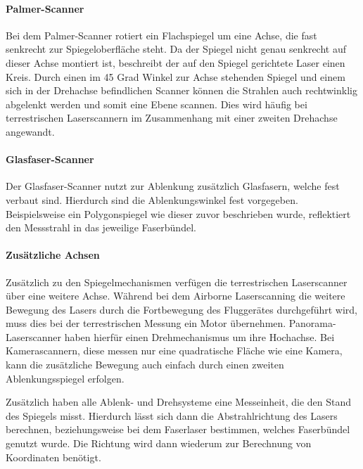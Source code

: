 \documentclass[a4paper,12pt,bibliography=totoc, listof=totoc,titlepage,pointlessnumbers]{scrreprt}
\begin{document}
\paragraph{Palmer-Scanner}
Bei dem Palmer-Scanner rotiert ein Flachspiegel um eine Achse, die fast senkrecht zur Spiegeloberfläche steht. Da der Spiegel nicht genau senkrecht auf dieser Achse montiert ist, beschreibt der auf den Spiegel gerichtete Laser einen Kreis. Durch einen im 45 Grad Winkel zur Achse stehenden Spiegel und einem sich in der Drehachse befindlichen Scanner können die Strahlen auch rechtwinklig abgelenkt werden und somit eine Ebene scannen. Dies wird häufig bei terrestrischen Laser\-scan\-nern im Zusammenhang mit einer zweiten Drehachse angewandt.

\paragraph{Glasfaser-Scanner}
\label{p:faserscanner}
Der Glasfaser-Scanner nutzt zur Ablenkung zu\-sätz\-lich Glasfasern, welche fest verbaut sind. Hierdurch sind die Ablenkungswinkel fest vorgegeben. Beispielsweise ein Polygonspiegel wie dieser zuvor beschrieben wurde, reflektiert den Messstrahl in das jeweilige Faserbündel. 

\paragraph{Zu\-sätz\-liche Achsen}
Zu\-sätz\-lich zu den Spiegelmechanismen verfügen die terrestrischen Laser\-scan\-ner über eine weitere Achse. Während bei dem Air\-borne Laser\-scan\-ning die weitere Bewegung des Lasers durch die Fortbewegung des Fluggerätes durchgeführt wird, muss dies bei der terrestrischen Messung ein Motor übernehmen. Panorama-Laser\-scan\-ner haben hierfür einen Drehmechanismus um ihre Hochachse. Bei Kamera\-scannern, diese messen nur eine quadratische Fläche wie eine Kamera, kann die zu\-sätz\-liche Bewegung auch einfach durch einen zweiten Ablenkungsspiegel erfolgen. \citep[S. 37]{beraldin}

Zu\-sätz\-lich haben alle Ablenk- und Drehsysteme eine Messeinheit, die den Stand des Spiegels misst. Hierdurch lässt sich dann die Abstrahlrichtung des Lasers berechnen, beziehungsweise bei dem Faserlaser bestimmen, welches Faserbündel genutzt wurde. Die Richtung wird dann wiederum zur Berechnung von Koordinaten benötigt.
\end{document}
